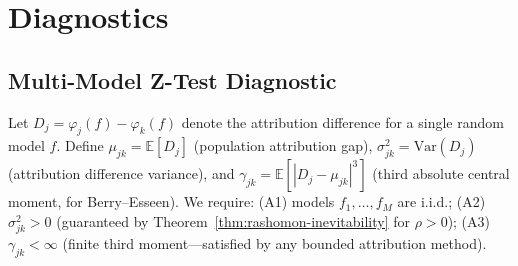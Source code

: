 \documentclass{article}
\newcommand{\E}{\mathbb{E}}
\newcommand{\Var}{\mathrm{Var}}
\begin{document}
\section{Diagnostics}
\label{sec:diagnostics}

\subsection{Multi-Model Z-Test Diagnostic}
\label{sec:f1}

Let $D_j = \varphi_j(f) - \varphi_k(f)$ denote the attribution difference for a single random model $f$. Define $\mu_{jk} = \E[D_j]$ (population attribution gap), $\sigma_{jk}^2 = \Var(D_j)$ (attribution difference variance), and $\gamma_{jk} = \E[|D_j - \mu_{jk}|^3]$ (third absolute central moment, for Berry--Esseen). We require: (A1) models $f_1, \ldots, f_M$ are i.i.d.; (A2) $\sigma_{jk}^2 > 0$ (guaranteed by Theorem~\ref{thm:rashomon-inevitability} for $\rho > 0$); (A3) $\gamma_{jk} < \infty$ (finite third moment---satisfied by any bounded attribution method).
\end{document}
